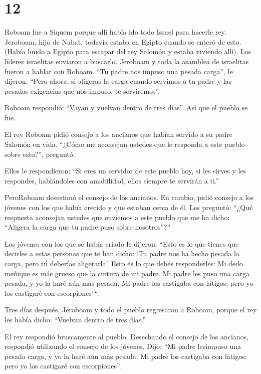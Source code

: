 \hypertarget{section-11}{%
\section{12}\label{section-11}}

 Roboam fue a Siquem porque allí había ido todo Israel para
hacerle rey.  Jeroboam, hijo de Nabat, todavía estaba en
Egipto cuando se enteró de esto. (Había huido a Egipto para escapar del
rey Salomón y estaba viviendo allí).  Los líderes israelitas
enviaron a buscarlo. Jeroboam y toda la asamblea de israelitas fueron a
hablar con Roboam.  ``Tu padre nos impuso una pesada
carga'', le dijeron. ``Pero ahora, si aligeras la carga cuando servimos
a tu padre y las pesadas exigencias que nos impuso, te serviremos''.

 Roboam respondió: ``Vayan y vuelvan dentro de tres días''.
Así que el pueblo se fue.

 El rey Roboam pidió consejo a los ancianos que habían
servido a su padre Salomón en vida. ``¿Cómo me aconsejan ustedes que le
responda a este pueblo sobre esto?'', preguntó.

 Ellos le respondieron: ``Si eres un servidor de este pueblo
hoy, si les sirves y les respondes, hablándoles con amabilidad, ellos
siempre te servirán a ti.''

 PeroRoboam desestimó el consejo de los ancianos. En cambio,
pidió consejo a los jóvenes con los que había crecido y que estaban
cerca de él.  Les preguntó: ``¿Qué respuesta aconsejan
ustedes que enviemos a este pueblo que me ha dicho: ``Aligera la carga
que tu padre puso sobre nosotros''?''

 Los jóvenes con los que se había criado le dijeron: ``Esto
es lo que tienes que decirles a estas personas que te han dicho: `Tu
padre nos ha hecho pesada la carga, pero tú deberías aligerarla'. Esto
es lo que debes responderles: Mi dedo meñique es más grueso que la
cintura de mi padre.  Mi padre les puso una carga pesada, y
yo la haré aún más pesada. Mi padre los castigaba con látigos; pero yo
los castigaré con escorpiones'\,``.

 Tres días después, Jeroboam y todo el pueblo regresaron a
Roboam, porque el rey les había dicho: ``Vuelvan dentro de tres días.''

 El rey respondió bruscamente al pueblo. Desechando el
consejo de los ancianos,  respondió utilizando el consejo
de los jóvenes. Dijo: ``Mi padre lesimpuso una pesada carga, y yo la
haré aún más pesada. Mi padre los castigaba con látigos; pero yo los
castigaré con escorpiones''.


